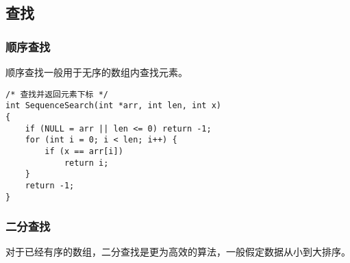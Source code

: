 \documentclass{ctexart}
\begin{document}
\subsection{查找}

\subsubsection{顺序查找}
顺序查找一般用于无序的数组内查找元素。
\begin{verbatim}
/* 查找并返回元素下标 */
int SequenceSearch(int *arr, int len, int x)
{
    if (NULL = arr || len <= 0) return -1;
    for (int i = 0; i < len; i++) {
        if (x == arr[i])
            return i;
    }
    return -1;
}
\end{verbatim}

\subsubsection{二分查找}
对于已经有序的数组，二分查找是更为高效的算法，一般假定数据从小到大排序。
\inputminted{c}{codes/binary-search.c}
\end{document}
